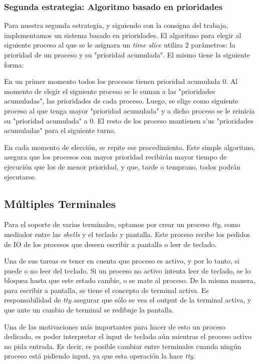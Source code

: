 \documentclass[a4paper,10pt]{article}
\begin{document}
        \subsubsection{Segunda estrategia: Algoritmo basado en prioridades}
        Para nuestra segunda estrategia, y siguiendo con la consigna del trabajo, implementamos un sistema basado en 
        prioridades. El algoritmo para elegir al siguiente proceso al que se le asignara un \textit{time slice} utiliza
        2 parámetros: la prioridad de un proceso y su "prioridad acumulada". El mismo tiene la siguiente forma:

        En un primer momento todos los procesos tienen prioridad acumulada 0. Al momento de elegir el siguiente proceso
        se le suman a las "prioridades acumuladas", las prioridades de cada proceso. Luego, se elige como siguiente 
        proceso al que tenga mayor "prioridad acumulada" y a dicho proceso se le reinicia su "prioridad acumulada" a 0.
        El resto de los proceso mantienen s'us "prioridades acumuladas" para el siguiente turno. 

        En cada momento de elección, se repite ese procedimiento. Este simple algoritmo, asegura que los procesos con 
        mayor prioridad recibirán mayor tiempo de ejecución que los de menor prioridad, y que, tarde o temprano, todos
        podrán ejecutarse.

\subsection{Múltiples Terminales}
Para el soporte de varias terminales, optamos por crear un proceso \textit{tty}, como mediador entre las \textit{shells} y el teclado y pantalla.
Este proceso recibe los pedidos de IO de los procesos que deseen escribir a pantalla o leer de teclado.

Una de sus tareas es tener en cuenta que proceso es activo, y por lo tanto, si puede o no leer del teclado.
Si un proceso no activo intenta leer de teclado, se lo bloquea hasta que este estado cambie, o se mate al proceso.
De la misma manera, para escribir a pantalla, se tiene el concepto de terminal activa.
Es responsabilidad de \textit{tty} asegurar que sólo se vea el output de la terminal activa, y que ante un cambio de terminal se redibuje la pantalla.

Una de las motivaciones más importantes para hacer de esto un proceso dedicado, es poder interpretar el input de teclado aún mientras el proceso activo no pida entrada.
Es decir, es posible cambiar entre terminales cuando ningún proceso está pidiendo input, ya que esta operación la hace \textit{tty}.
\end{document}
